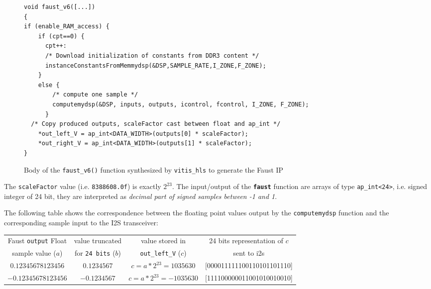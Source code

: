 \documentclass[11pt]{article}
\numberwithin{equation}{section}
\numberwithin{figure}{section}
\begin{document}
\begin{figure}

\begin{boxedminipage}{\textwidth}
    \small
\begin{verbatim}
void faust_v6([...])
{
if (enable_RAM_access) {
    if (cpt==0) {
      cpt++:
      /* Download initialization of constants from DDR3 content */
      instanceConstantsFromMemmydsp(&DSP,SAMPLE_RATE,I_ZONE,F_ZONE);
    }
    else {
        /* compute one sample */
        computemydsp(&DSP, inputs, outputs, icontrol, fcontrol, I_ZONE, F_ZONE);
      } 
  /* Copy produced outputs, scaleFactor cast between float and ap_int */
    *out_left_V = ap_int<DATA_WIDTH>(outputs[0] * scaleFactor);
    *out_right_V = ap_int<DATA_WIDTH>(outputs[1] * scaleFactor);
}
\end{verbatim}
\end{boxedminipage}
\caption{Body of the {\tt faust\_v6()} function synthesized by {\tt vitis\_hls} to generate the Faust IP}
\label{fig:body}
\end{figure}


The {\tt scaleFactor} value (i.e. {\tt 8388608.0f}) is exactly $2^{23}$. The input/output of the {\tt \bf faust} function are arrays of type {\tt ap\_int<24>}, i.e. signed integer of 24 bit, they are interpreted as {\em decimal part of signed samples between -1 and 1}.

The following table shows the correspondence between the floating point values output by the {\tt computemydsp} function and the corresponding sample input to the I2S transceiver:
{\small
  \begin{tabular}{|c|c|c|c|}
  \hline
  Faust {\tt output} Float  & value truncated  & value stored in  & 24 bits representation of $c$\\
  sample value ($a$) & for {\tt 24 bits} ($b$) &   {\tt out\_left\_V} ($c$)  & sent to i2s  \\
  \hline 
  $0.12345678123456$ & $0.1234567$ & $c=a*2^{23}=1035630$ & [000011111100110101101110] \\
  \hline
$-0.12345678123456$ & $-0.1234567$ & $c=a*2^{23}=-1035630$ & [111100000011001010010010]\\
\hline
\end{tabular}
}
\end{document}
